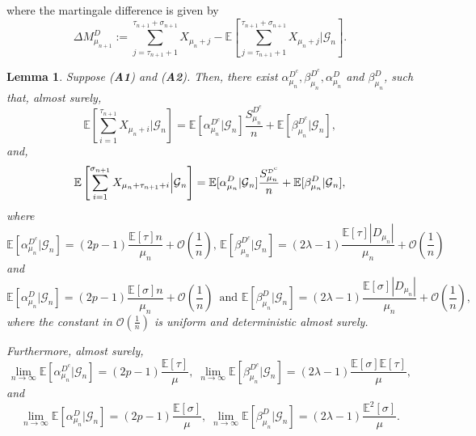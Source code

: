 \documentclass{article}
\numberwithin{equation}{section}
\newtheorem{lemma}[theorem]{Lemma}
\newcommand{\GG}{\mbox{${\mathcal G}$}}
\newcommand{\OO}{\mbox{${\mathcal O}$}}
\newcommand{\sDD}{\tiny{\mbox{${\mathcal D}$}}}
\newcommand{\1}{\mathbf{1}}
\newcommand{\0}{\mathbf{0}}
\newcommand{\E}{\mbox{${\mathbb E}$}}
\begin{document}
where the martingale difference is given by 
\begin{equation}
\label{Eq: martingale_diff_D}
\Delta M_{\mu_{n+1}}^{D}:= \sum_{j=\tau_{n+1}+1}^{\tau_{n+1}+\sigma_{n+1}} X_{\mu_n +j}- \E \left[\sum_{j=\tau_{n+1}+1}^{\tau_{n+1}+\sigma_{n+1}} X_{\mu_n +j}\Big | \GG_n\right].
\end{equation}
\begin{lemma} 
\label{lem:alpha_beta}
Suppose (\textbf{A1}) and (\textbf{A2}). Then, there exist $\alpha_{\mu_n}^{D^c}, \beta_{\mu_n}^{D^c}, \alpha_{\mu_n}^{D}$ and $\beta_{\mu_n}^{D}$,  
such that, almost surely, 
\begin{equation}
\label{condE_D^c} 
\E\left[ \sum\limits_{i=1}^{\tau_{n+1}} X_{\mu_{n} + i} \Big \vert \GG_n \right] =  \E[\alpha_{\mu_n}^{D^c} \vert \GG_n] \frac{S_{\mu_n}^{D^c}}{n} + \E[\beta_{\mu_n}^{D^c} \vert \GG_n], 
\end{equation}
and,
\begin{equation} 
\label{condE_D} 
\E\left[ \sum\limits_{i=1}^{\sigma_{n+1}} X_{\mu_{n} + \tau_{n+1} + i} \Big \vert \GG_n \right] =  \E[\alpha_{\mu_n}^{D} \vert \GG_n] \frac{S_{\mu_n}^{\sDD^c}}{n} + \E[\beta_{\mu_n}^{D} \vert \GG_n], 
\end{equation}
where
\begin{equation}
\label{Eq: limit_of_alpha_beta_D_c}
\E[\alpha_{\mu_n}^{D^c} \vert \GG_{n}] = (2p-1)\frac{\E[\tau]n}{\mu_n}+ \OO\left(\frac{1}{n}\right),\, \E[\beta_{\mu_n}^{D^c} \vert \GG_{n}] = (2\lambda-1)\frac{\E[\tau]|D_{\mu_n}|}{\mu_n} + \OO\left(\frac{1}{n}\right)
\end{equation}
and 
\begin{equation}
\label{Eq: Eq: limit_of_alpha_beta_D}
\E[\alpha_{\mu_n}^{D} \vert \GG_{n}] = (2p-1)\frac{\E[\sigma]n}{\mu_n} + \OO\left(\frac{1}{n}\right)\, \text{ and } 
\E[\beta_{\mu_n}^{D} \vert \GG_{n}] = (2\lambda-1)\frac{\E[\sigma]|D_{\mu_n}|}{\mu_n} + 
\OO\left(\frac{1}{n}\right),
\end{equation}
where the constant in $\OO \left(\frac{1}{n}\right)$ is uniform and deterministic almost surely. 

Furthermore, almost surely, 
 \begin{equation} 
 \label{eq:alpha_beta_limits}
 \lim_{n \to \infty} \E[\alpha_{\mu_n}^{D^c} \vert \GG_{n}]=(2p-1)\frac{\E[\tau]}{\mu}, \; \lim_{n \to \infty}\E[\beta_{\mu_n}^{D^c} \vert \GG_{n}]=(2\lambda-1)\frac{\E \left[\sigma \right]\E[\tau]}{\mu},  
 \end{equation} 
 and 
 \begin{equation}
 \label{Eq: alpha_beta_D_lim}
 \lim_{n \to \infty}\E[\alpha_{\mu_n}^{D} \vert \GG_n]= (2p-1)\frac{\E[\sigma]}{\mu}, \;
 \lim_{n \to \infty} \E[\beta_{\mu_n}^{D} \vert \GG_{n}]= (2\lambda-1)\frac{\E^2[\sigma]}{\mu}.
\end{equation}

\end{lemma}
\end{document}
